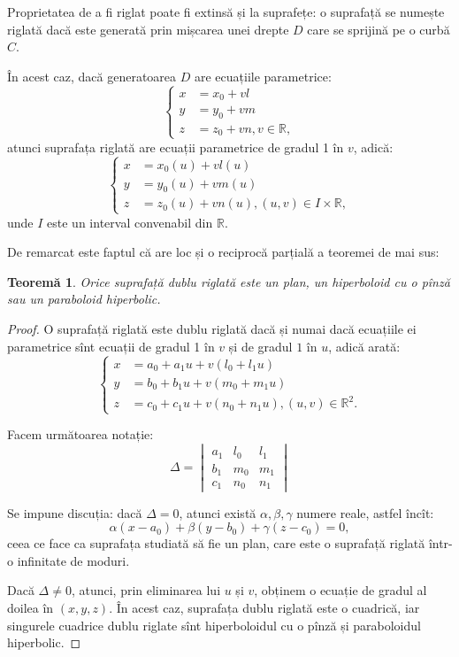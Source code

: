 \documentclass[11pt,a4paper]{article}
\theoremstyle{dotless}
\newtheorem{theorem}{Teorem\u{a}}[section]
\theoremstyle{dotlessdr}
\begin{document}
Proprietatea de a fi riglat poate fi extinsă și la suprafețe: o suprafață se
numește riglată dacă este generată prin mișcarea unei drepte $D$ care se 
sprijină pe o curbă $C$.

În acest caz, dacă generatoarea $D$ are ecuațiile parametrice: 
 \[
	\begin{cases}	
	    x &= x_0 + vl \\
	    y &= y_0 + vm \\
	    z &= z_0 + vn, v \in \mathbb{R},
    \end{cases}
\]
atunci suprafața riglată are ecuații parametrice de gradul 1 în $v$, adică: 
 \[
	\begin{cases}	
	    x &= x_0(u) + vl(u) \\
	    y &= y_0(u) + vm(u) \\
	    z &= z_0(u) + vn(u), (u,v) \in I \times \mathbb{R},
    \end{cases}
\]
unde $I$ este un interval convenabil din $\mathbb{R}$.

De remarcat este faptul că are loc și o reciprocă parțială a teoremei 
de mai sus:

\begin{theorem}
	Orice suprafață dublu riglată este un plan, un hiperboloid cu o pînză
sau un paraboloid hiperbolic.
\end{theorem}

\begin{proof}
	O suprafață riglată este dublu riglată dacă și numai dacă ecuațiile ei
parametrice sînt ecuații de gradul 1 în $v$ și de gradul $1$ în $u$, adică
arată: 
 \[
	\begin{cases}	
	    x &= a_0 + a_1 u + v(l_0 + l_1 u) \\
	    y &= b_0 + b_1 u + v(m_0 + m_1 u) \\
	    z &= c_0 + c_1 u + v(n_0 + n_1 u), (u, v) \in \mathbb{R}^2.
    \end{cases}
\]

Facem următoarea notație: 
 \[
	\Delta = \begin{vmatrix}
	             a_1 & l_0 & l_1 \\
	             b_1 & m_0 & m_1 \\
	             c_1 & n_0 & n_1
             \end{vmatrix}
\]

Se impune discuția: dacă $\Delta = 0$, atunci există $\alpha, \beta, \gamma$
numere reale, astfel încît: 
 \[
	\alpha (x - a_0) + \beta (y - b_0) + \gamma(z - c_0) = 0,
\]
ceea ce face ca suprafața studiată să fie un plan, care este o suprafață riglată
într-o infinitate de moduri.

Dacă $\Delta \neq 0$, atunci, prin eliminarea lui $u$ și $v$, obținem o ecuație
de gradul al doilea în $(x, y, z)$. În acest caz, suprafața dublu riglată este
o cuadrică, iar singurele cuadrice dublu riglate sînt hiperboloidul cu
o pînză și paraboloidul hiperbolic.
\end{proof}
\end{document}
